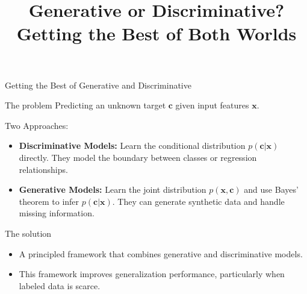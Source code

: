 \documentclass[11pt,pdf,hyperref={unicode}]{beamer}
\title{ Generative or Discriminative?\\
Getting the Best of Both Worlds}
\begin{document}
\begin{frame}
\titlepage
\end{frame}
\setcounter{page}{2}%
\begin{frame}{Getting the Best of Generative and Discriminative}

\begin{block}{The problem}
    Predicting an unknown target $\mathbf{c}$ given input features $\mathbf{x}$.
\end{block}
\begin{block}{Two Approaches:}
    \begin{itemize}
        \item \textbf{Discriminative Models:} Learn the conditional distribution $p(\mathbf{c}|\mathbf{x})$ directly.  They model the boundary between classes or regression relationships.
        \item \textbf{Generative Models:} Learn the joint distribution $p(\mathbf{x}, \mathbf{c})$ and use Bayes’ theorem to infer $p(\mathbf{c}|\mathbf{x})$. They can generate synthetic data and handle missing information.
    \end{itemize}
\end{block}
\begin{block}{The solution} 
\begin{itemize}
    \item A principled framework that combines generative and discriminative models.
    \item This framework improves generalization performance, particularly when labeled data is scarce.
\end{itemize}
\end{block}
\end{frame}
\end{document}
